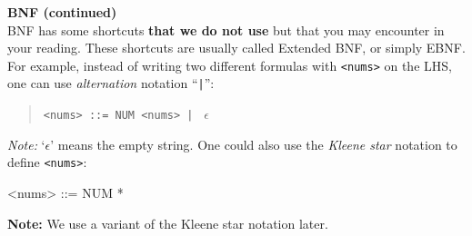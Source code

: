 \begin{minipage}[t]{\sw}
\slidenumber
\LARGE
{\bf BNF (continued)}\\[2ex]
\emm{\Large\LightBox{\MYlon}}\exx
BNF has some shortcuts {\bf that we do not use}
but that you may encounter in your reading.
These shortcuts are usually called Extended BNF, or simply EBNF.
For example, instead of writing two different formulas
with \verb'<nums>' on the LHS,
one can use {\em alternation} notation ``\verb'|''':
\begin{quote}
\verb'<nums> ::= NUM <nums> | ' $\epsilon$
\end{quote}
{\em Note:} `$\epsilon$' means the empty string.\exx
One could also use the {\em Kleene star} notation
to define \verb'<nums>':
\begin{qv}
<nums> ::= { NUM }*
\end{qv}
{\bf Note:} We use a variant of the Kleene star notation later.
\end{minipage}
\clearpage
